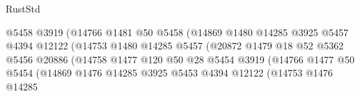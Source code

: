 \begin{lexlean}{RustStd}
\begin{coremodule}
                                            @5458
                                            @3919
                                            (@14766
                                              @1481
                                              @50
                                              @5458
                                              (@14869
                                                @1480
                                                @14285
                                                @3925
                                                @5457
                                                @4394
                                                @12122
                                                (@14753
                                                  @1480
                                                  @14285
                                                  @5457
                                                  (@20872
                                                    @1479
                                                    @18
                                                    @52
                                                    @5362
                                                    @5456
                                                    @20886
                                                    (@14758
                                                      @1477
                                                      @120
                                                      @50
                                                      @28
                                                      @5454
                                                      @3919
                                                      (@14766
                                                        @1477
                                                        @50
                                                        @5454
                                                        (@14869
                                                          @1476
                                                          @14285
                                                          @3925
                                                          @5453
                                                          @4394
                                                          @12122
                                                          (@14753
                                                            @1476
                                                            @14285

\end{coremodule}
\end{lexlean}
